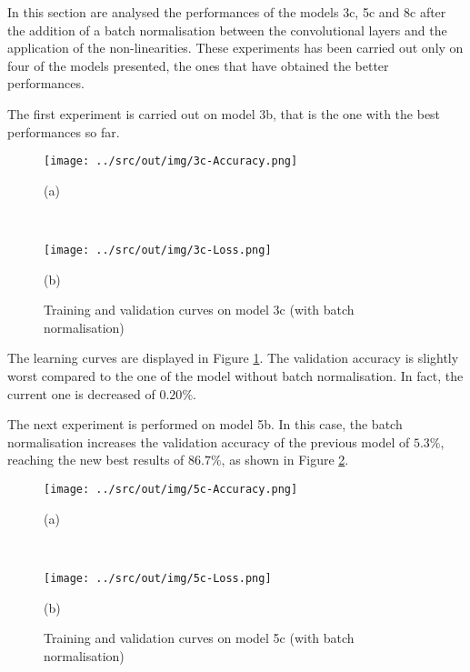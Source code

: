 \documentclass[a4paper,12pt]{article} %
\begin{document}
	In this section are analysed the performances of the models 3c, 5c and 8c
	after the addition of a batch normalisation between the convolutional 
	layers and the application of the non-linearities. 
	These experiments has been carried out only on four of the models 
	presented, the ones that have obtained the better performances.
	\newline
	
	The first experiment is carried out on model 3b, that is the one with the 
	best performances so far. 
	
	\begin{figure}[htb]
		\begin{minipage}[c]{.49\textwidth}
			\centering
			\texttt{[image: ../src/out/img/3c-Accuracy.png]}
			\caption*{(a)}
		\end{minipage}
		~
		\begin{minipage}[c]{.49\textwidth}
			\centering
			\texttt{[image: ../src/out/img/3c-Loss.png]}
			\caption*{(b)}
		\end{minipage}
		\caption{Training and validation curves on model 3c (with batch 
			normalisation)}
		\label{fig:model3c-performance}
	\end{figure}

	The learning curves are displayed in Figure \ref{fig:model3c-performance}. 
	The validation accuracy is slightly worst compared to the one of the model 
	without batch normalisation. In fact, the current one 
	is decreased of $0.20\%$. %
	\newline
		
	The next experiment is performed on model 5b. In this case, the batch 
	normalisation increases the validation accuracy of the previous model of 
	$5.3\%$, reaching the new best results of $86.7\%$, as shown in Figure 
	\ref{fig:model5c-performance}.
	
	\begin{figure}[htb]
		\begin{minipage}[c]{.49\textwidth}
			\centering
			\texttt{[image: ../src/out/img/5c-Accuracy.png]}
			\caption*{(a)}
		\end{minipage}
		~
		\begin{minipage}[c]{.49\textwidth}
			\centering
			\texttt{[image: ../src/out/img/5c-Loss.png]}
			\caption*{(b)}
		\end{minipage}
		\caption{Training and validation curves on model 5c (with batch 
			normalisation)}
		\label{fig:model5c-performance}
	\end{figure}
	
\end{document}
